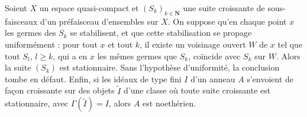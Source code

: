 \begin{encadre}
\begin{theoreme*}
Soient $X$ un espace quasi-compact et $(S_k)_{k \in \mathbf N}$ une suite croissante de sous-faisceaux d'un préfaisceau d'ensembles sur $X$. On suppose qu'en chaque point $x$ les germes des $S_k$ se stabilisent, et que cette stabilisation se propage uniformément : pour tout $x$ et tout $k$, il existe un voisinage ouvert $W$ de $x$ tel que tout $S_l$, $l \geq k$, qui a en $x$ les mêmes germes que $S_k$, coïncide avec $S_k$ sur $W$. Alors la suite $(S_k)$ est stationnaire. Sans l'hypothèse d'uniformité, la conclusion tombe en défaut. Enfin, si les idéaux de type fini $I$ d'un anneau $A$ s'envoient de façon croissante sur des objets $\widetilde I$ d'une classe où toute suite croissante est stationnaire, avec $\Gamma(\widetilde I) = I$, alors $A$ est noethérien.
\end{theoreme*}
\end{encadre}
